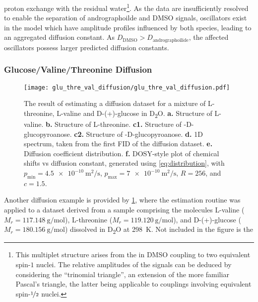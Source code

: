 proton exchange with the residual water\footnote{
    This multiplet structure arises from the  in \acs{DMSO} coupling to
    two
    equivalent spin-$1$  nuclei. The relative amplitudes of the signals
    can be deduced by considering the ``trinomial triangle'', an extension of
    the more familiar Pascal's triangle, the latter being applicable to
    couplings involving equivalent spin-$\nicefrac{1}{2}$ nuclei.
}. As the
data are insufficiently resolved to enable the separation of andrographoilde and
\acs{DMSO} signals, oscillators exist in the model which have amplitude profiles
influenced by both species, leading to an aggregated diffusion constant. As
$D_{\text{DMSO}} > D_{\text{andrographoilide}}$, the affected oscillators
possess larger predicted diffusion constants.

\subsubsection{Glucose/Valine/Threonine Diffusion}
\begin{figure}
    \centering
    \texttt{[image: glu\_thre\_val\_diffusion/glu\_thre\_val\_diffusion.pdf]}
    \caption[
        The result of estimating a diffusion dataset for a mixture of L-threonine,
        L-valine and D-(+)-glucose.
    ]{
        The result of estimating a diffusion dataset for a mixture of L-threonine,
        L-valine and D-(+)-glucose in D\textsubscript{2}O.
        \textbf{a.} Structure of L-valine.
        \textbf{b.} Structure of L-threonine.
        \textbf{c1.} Structure of \textalpha-D-glucopyroanose.
        \textbf{c2.} Structure of \textbeta-D-glucopyroanose.
        \textbf{d.} \acs{1D} spectrum, taken from the first \acs{FID} of the
        diffusion dataset.
        \textbf{e.} Diffusion coefficient distribution.
        \textbf{f.} \acs{DOSY}-style plot of chemical shifts vs diffusion
        constant, generated using \cref{eq:distribution}, with
        $p_{\text{min}} = \qty{4.5e-10}{\meter\squared\per\second}$,
        $p_{\text{max}} = \qty{7e-10}{\meter\squared\per\second}$,
        $R=256$, and $c=1.5$.
    }
    \label{fig:gluc_val_thre}
\end{figure}
Another diffusion example is provided by \cref{fig:gluc_val_thre}, where the
estimation routine was applied to a dataset derived from a sample comprising
the molecules L-valine ($M_r = \qty{117.148}{\gram\per\mole}$),
L-threonine ($M_r = \qty{119.120}{\gram\per\mole}$), and D-(+)-glucose ($M_r =
\qty{180.156}{\gram\per\mole}$) dissolved in
D\textsubscript{2}O at \qty{298}{\kelvin}. Not included in the figure is the
